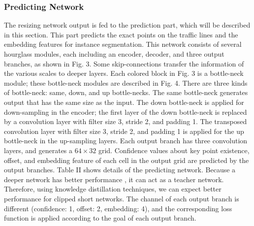\documentclass[journal]{IEEEtran}
\begin{document}
\subsubsection{Predicting Network}
The resizing network output is fed to the prediction part, which will be described in this section. This part predicts the exact points on the traffic lines and the embedding features for instance segmentation. This network consists of several hourglass modules, each including an encoder, decoder, and three output branches, as shown in Fig. 3. Some skip-connections transfer the information of the various scales to deeper layers. Each colored block in Fig. 3 is a bottle-neck module; these bottle-neck modules are described in Fig. 4. There are three kinds of bottle-neck: same, down, and up bottle-necks. The same bottle-neck generates output that has the same size as the input. The down bottle-neck is applied for down-sampling in the encoder; the first layer of the down bottle-neck is replaced by a convolution layer with filter size 3, stride 2, and padding 1. The transposed convolution layer with filter size 3, stride 2, and padding 1 is applied for the up bottle-neck in the up-sampling layers. Each output branch has three convolution layers, and generates a $64 \times 32$ grid. Confidence values about key point existence, offset, and embedding feature of each cell in the output grid are predicted by the output branches. Table II shows details of the predicting network. Because a deeper network has better performance \cite{newell2016stacked}, it can act as a teacher network. Therefore, using knowledge distillation techniques, we can expect better performance for clipped short networks. The channel of each output branch is different (confidence: 1, offset: 2, embedding: 4), and the corresponding loss function is applied according to the goal of each output branch.
\end{document}
